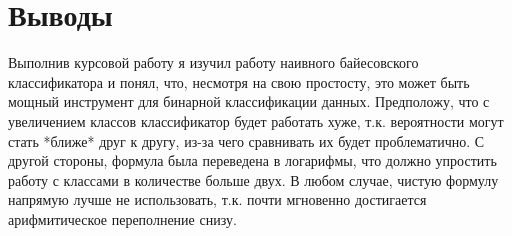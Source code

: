 \section{Выводы}

Выполнив курсовой работу я изучил работу наивного байесовского классификатора и понял, что, несмотря на свою простосту, это может быть мощный инструмент для бинарной классификации данных.
Предположу, что с увеличением классов классификатор будет работать хуже, т.к. вероятности могут стать *ближе* друг к другу, из-за чего сравнивать их будет проблематично. С другой стороны,
формула была переведена в логарифмы, что должно упростить работу с классами в количестве больше двух. В любом случае, чистую формулу напрямую лучше не использовать, т.к. почти мгновенно достигается
арифмитическое переполнение снизу.

\pagebreak
